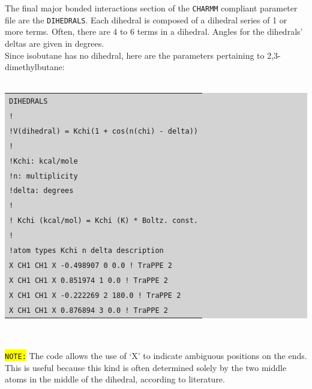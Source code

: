 The final major bonded interactions section of the \texttt{CHARMM} compliant parameter file are the \texttt{DIHEDRALS}. Each dihedral is composed of a dihedral series of 1 or more terms. Often, there are 4 to 6 terms in a dihedral. Angles for the dihedrals' deltas are given in degrees.\\
Since isobutane has no dihedral, here are the parameters pertaining to 2,3-dimethylbutane:\\\\
\colorbox{lightgray}{
\begin{tabular}{l}
\texttt{DIHEDRALS}\\
\texttt{!}\\
\texttt{!V(dihedral) = Kchi(1 + cos(n(chi) - delta))}\\
\texttt{!}\\
\texttt{!Kchi: kcal/mole}\\
\texttt{!n: multiplicity}\\
\texttt{!delta: degrees}\\
\texttt{!}\\
\texttt{! Kchi (kcal/mol) = Kchi (K) * Boltz. const.}\\
\texttt{!}\\
\texttt{!atom types         Kchi        n    delta              description}\\
\texttt{X   CH1 CH1 X      -0.498907    0       0.0              ! TraPPE 2}\\
\texttt{X   CH1 CH1 X       0.851974    1       0.0              ! TraPPE 2}\\
\texttt{X   CH1 CH1 X      -0.222269    2   180.0              ! TraPPE 2}\\
\texttt{X   CH1 CH1 X       0.876894    3       0.0              ! TraPPE 2}\\
\end{tabular}}\\\\
\colorbox{yellow}{\texttt{NOTE:}} The code allows the use of `X' to indicate ambiguous positions on the ends. This is useful because this kind is often determined solely by the two middle atoms in the middle of the dihedral, according to literature.
